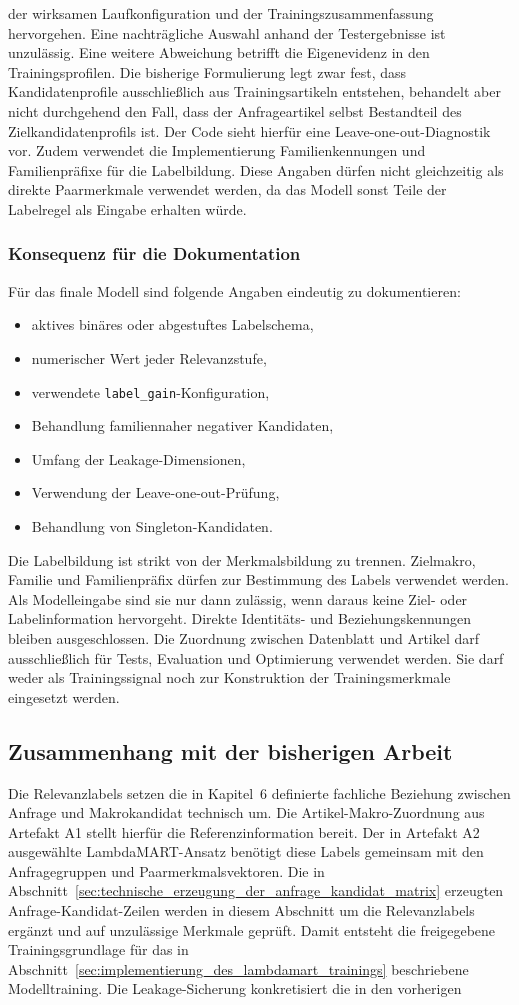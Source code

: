 der wirksamen Laufkonfiguration und der Trainingszusammenfassung hervorgehen. Eine nachträgliche Auswahl anhand der Testergebnisse ist unzulässig. Eine weitere Abweichung betrifft die Eigenevidenz in den Trainingsprofilen. Die bisherige Formulierung legt zwar fest, dass Kandidatenprofile ausschließlich aus Trainingsartikeln entstehen, behandelt aber nicht durchgehend den Fall, dass der Anfrageartikel selbst Bestandteil des Zielkandidatenprofils ist. Der Code sieht hierfür eine Leave-one-out-Diagnostik vor. Zudem verwendet die Implementierung Familienkennungen und Familienpräfixe für die Labelbildung. Diese Angaben dürfen nicht gleichzeitig als direkte Paarmerkmale verwendet werden, da das Modell sonst Teile der Labelregel als Eingabe erhalten würde. \subsubsection*{Konsequenz für die Dokumentation} Für das finale Modell sind folgende Angaben eindeutig zu dokumentieren: \begin{itemize} \item aktives binäres oder abgestuftes Labelschema, \item numerischer Wert jeder Relevanzstufe, \item verwendete \texttt{label\_gain}-Konfiguration, \item Behandlung familiennaher negativer Kandidaten, \item Umfang der Leakage-Dimensionen, \item Verwendung der Leave-one-out-Prüfung, \item Behandlung von Singleton-Kandidaten. \end{itemize} Die Labelbildung ist strikt von der Merkmalsbildung zu trennen. Zielmakro, Familie und Familienpräfix dürfen zur Bestimmung des Labels verwendet werden. Als Modelleingabe sind sie nur dann zulässig, wenn daraus keine Ziel- oder Labelinformation hervorgeht. Direkte Identitäts- und Beziehungskennungen bleiben ausgeschlossen. Die Zuordnung zwischen Datenblatt und Artikel darf ausschließlich für Tests, Evaluation und Optimierung verwendet werden. Sie darf weder als Trainingssignal noch zur Konstruktion der Trainingsmerkmale eingesetzt werden. \subsection{Zusammenhang mit der bisherigen Arbeit} \label{subsec:zusammenhang_labels_leakage} Die Relevanzlabels setzen die in Kapitel~6 definierte fachliche Beziehung zwischen Anfrage und Makrokandidat technisch um. Die Artikel-Makro-Zuordnung aus Artefakt A1 stellt hierfür die Referenzinformation bereit. Der in Artefakt A2 ausgewählte LambdaMART-Ansatz benötigt diese Labels gemeinsam mit den Anfragegruppen und Paarmerkmalsvektoren. Die in Abschnitt~\ref{sec:technische_erzeugung_der_anfrage_kandidat_matrix} erzeugten Anfrage-Kandidat-Zeilen werden in diesem Abschnitt um die Relevanzlabels ergänzt und auf unzulässige Merkmale geprüft. Damit entsteht die freigegebene Trainingsgrundlage für das in Abschnitt~\ref{sec:implementierung_des_lambdamart_trainings} beschriebene Modelltraining. Die Leakage-Sicherung konkretisiert die in den vorherigen 
